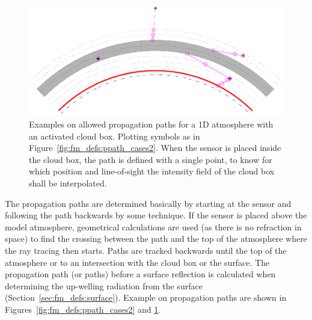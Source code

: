 \begin{figure}[p]
 \begin{center}
  \includegraphics*[width=0.99\hsize]{ppath_cases1}
  \caption{Examples on allowed propagation paths for a 1D atmosphere
    with an activated cloud box. Plotting symbols as in
    Figure~\ref{fig:fm_defs:ppath_cases2}. When the sensor is placed 
    inside the cloud box, the path is defined with a single point, 
    to know for which position and line-of-sight the intensity field of
    the cloud box shall be interpolated. }
  \label{fig:fm_defs:ppath_cases1}
 \end{center}
\end{figure}



The propagation paths are determined basically by starting at the
sensor and following the path backwards by some  technique. If the sensor is placed above the model
atmosphere, geometrical calculations are used (as there is no
refraction in space) to find the crossing between the path and the top
of the atmosphere where the ray tracing then starts. Paths are tracked
backwards until the top of the atmosphere or to an
intersection with the cloud box or the surface. The propagation path
(or paths) before a surface reflection is calculated when determining
the up-welling radiation from the surface
(Section~\ref{sec:fm_defs:surface}). Example on propagation
paths are shown in Figures~\ref{fig:fm_defs:ppath_cases2} and 
\ref{fig:fm_defs:ppath_cases1}.
 
